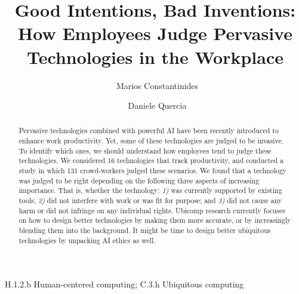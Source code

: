 \documentclass{IEEEcsmag}
\begin{document}


\title{Good Intentions, Bad Inventions: How Employees Judge Pervasive Technologies in the Workplace}


\author{\ Marios Constantinides}

\author{\ Daniele Quercia}


\begin{abstract}
Pervasive technologies combined with powerful AI have been recently introduced to enhance work productivity. Yet, some of these technologies are judged to be invasive. To identify which ones, we should understand how employees tend to judge these technologies. We considered 16 technologies that track productivity, and conducted a study in which 131 crowd-workers judged these scenarios. We found that a technology was judged to be right depending on the following three aspects of increasing importance. That is, whether the technology: \emph{1)} was currently supported by existing tools; \emph{2)} did not interfere with work or was fit for purpose; and \emph{3)} did not cause any harm or did not infringe on any individual rights. Ubicomp research currently focuses on how to design better technologies by making them more accurate, or by increasingly blending them into the background. It might be time to design better ubiquitous technologies by unpacking AI ethics as well.
\end{abstract}


\maketitle

\begin{IEEEkeywords}
H.1.2.b Human-centered computing; C.3.h Ubiquitous computing
\end{IEEEkeywords}










  
\end{document}
